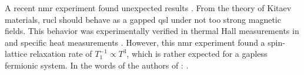 


A recent \acrfull{nmr} experiment found unexpected results \cite{Zheng-gapless2017}. From the theory of Kitaev materials,  \acrshort{rucl} should behave as a gapped \acrshort{qsl} under not too strong magnetic fields. This behavior was experimentally verified in  thermal Hall measurements in \cite{Kasahara_2018,yokoi2020halfinteger} and specific heat measurements \cite{tanaka2020}. However,  this \acrshort{nmr} experiment found a spin-lattice relaxation rate of $T_1^{-1} \propto T^3$, which is rather expected for a gapless fermionic system. In the words of the authors of \cite{Zheng-gapless2017}: .  

